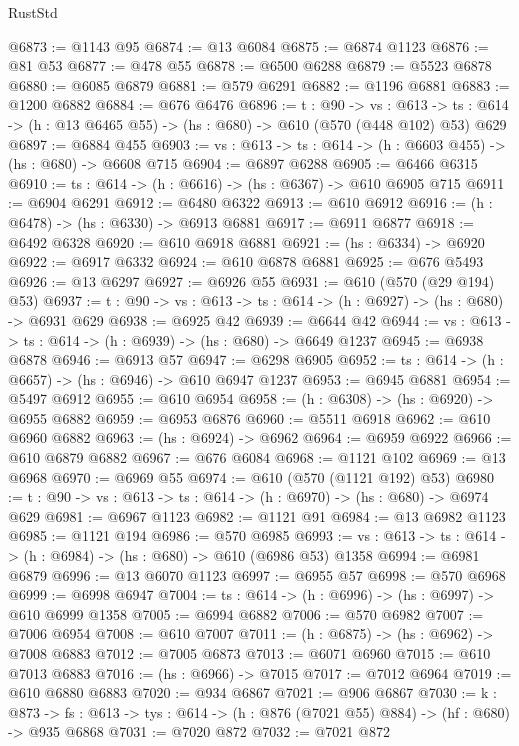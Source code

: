 \begin{lexlean}{RustStd}
\begin{coremodule}
@6873 := @1143 @95
@6874 := @13 @6084
@6875 := @6874 @1123
@6876 := @81 @53
@6877 := @478 @55
@6878 := @6500 @6288
@6879 := @5523 @6878
@6880 := @6085 @6879
@6881 := @579 @6291
@6882 := @1196 @6881
@6883 := @1200 @6882
@6884 := @676 @6476
@6896 := {t : @90} ->
  {vs : @613} ->
  {ts : @614} -> (h : @13 @6465 @55) -> (hs : @680) -> @610 (@570 (@448 @102) @53) @629
@6897 := @6884 @455
@6903 := {vs : @613} -> {ts : @614} -> (h : @6603 @455) -> (hs : @680) -> @6608 @715
@6904 := @6897 @6288
@6905 := @6466 @6315
@6910 := {ts : @614} -> (h : @6616) -> (hs : @6367) -> @610 @6905 @715
@6911 := @6904 @6291
@6912 := @6480 @6322
@6913 := @610 @6912
@6916 := (h : @6478) -> (hs : @6330) -> @6913 @6881
@6917 := @6911 @6877
@6918 := @6492 @6328
@6920 := @610 @6918 @6881
@6921 := (hs : @6334) -> @6920
@6922 := @6917 @6332
@6924 := @610 @6878 @6881
@6925 := @676 @5493
@6926 := @13 @6297
@6927 := @6926 @55
@6931 := @610 (@570 (@29 @194) @53)
@6937 := {t : @90} -> {vs : @613} -> {ts : @614} -> (h : @6927) -> (hs : @680) -> @6931 @629
@6938 := @6925 @42
@6939 := @6644 @42
@6944 := {vs : @613} -> {ts : @614} -> (h : @6939) -> (hs : @680) -> @6649 @1237
@6945 := @6938 @6878
@6946 := @6913 @57
@6947 := @6298 @6905
@6952 := {ts : @614} -> (h : @6657) -> (hs : @6946) -> @610 @6947 @1237
@6953 := @6945 @6881
@6954 := @5497 @6912
@6955 := @610 @6954
@6958 := (h : @6308) -> (hs : @6920) -> @6955 @6882
@6959 := @6953 @6876
@6960 := @5511 @6918
@6962 := @610 @6960 @6882
@6963 := (hs : @6924) -> @6962
@6964 := @6959 @6922
@6966 := @610 @6879 @6882
@6967 := @676 @6084
@6968 := @1121 @102
@6969 := @13 @6968
@6970 := @6969 @55
@6974 := @610 (@570 (@1121 @192) @53)
@6980 := {t : @90} -> {vs : @613} -> {ts : @614} -> (h : @6970) -> (hs : @680) -> @6974 @629
@6981 := @6967 @1123
@6982 := @1121 @91
@6984 := @13 @6982 @1123
@6985 := @1121 @194
@6986 := @570 @6985
@6993 := {vs : @613} -> {ts : @614} -> (h : @6984) -> (hs : @680) -> @610 (@6986 @53) @1358
@6994 := @6981 @6879
@6996 := @13 @6070 @1123
@6997 := @6955 @57
@6998 := @570 @6968
@6999 := @6998 @6947
@7004 := {ts : @614} -> (h : @6996) -> (hs : @6997) -> @610 @6999 @1358
@7005 := @6994 @6882
@7006 := @570 @6982
@7007 := @7006 @6954
@7008 := @610 @7007
@7011 := (h : @6875) -> (hs : @6962) -> @7008 @6883
@7012 := @7005 @6873
@7013 := @6071 @6960
@7015 := @610 @7013 @6883
@7016 := (hs : @6966) -> @7015
@7017 := @7012 @6964
@7019 := @610 @6880 @6883
@7020 := @934 @6867
@7021 := @906 @6867
@7030 := {k : @873} ->
  {fs : @613} -> {tys : @614} -> (h : @876 (@7021 @55) @884) -> (hf : @680) -> @935 @6868
@7031 := @7020 @872
@7032 := @7021 @872

\end{coremodule}
\end{lexlean}
